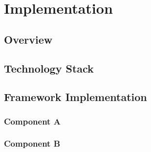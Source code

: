 
%

\chapter{Implementation}
\label{cha:implementation}

\section{Overview}
\label{sec:impl-overview}



\section{Technology Stack}
\label{sec:tech-stack}



\section{Framework Implementation}
\label{sec:framework-impl}


\subsection{Component A}
\label{sec:component-a}


\subsection{Component B}
\label{sec:component-b}

